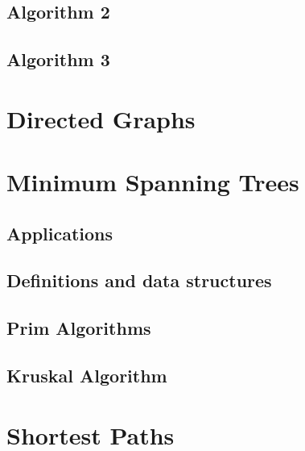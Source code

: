 \documentclass{beamer}
\begin{document}
\subsection{Algorithm 2}

\subsection{Algorithm 3}


\section{Directed Graphs}
\begin{frame}
\end{frame}

\section{Minimum Spanning Trees}
\subsection{Applications}
\begin{frame}
\end{frame}
\subsection{Definitions and data structures}
\begin{frame}
\end{frame}
\subsection{Prim Algorithms}
\begin{frame}
\end{frame}
\subsection{Kruskal Algorithm}
\begin{frame}
\end{frame}

\section{Shortest Paths}
\begin{frame}
\end{frame}
\end{document}
